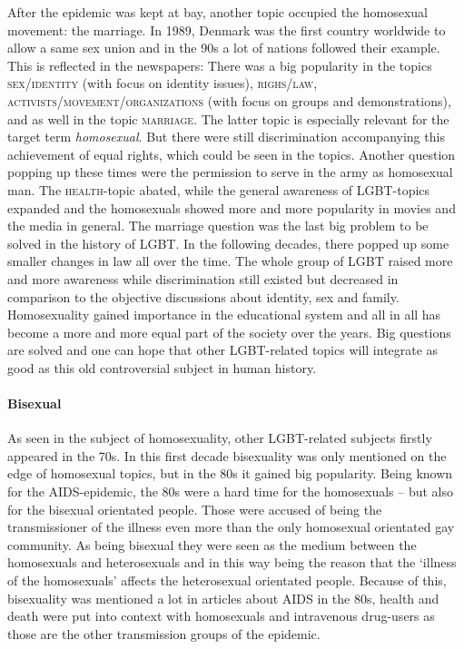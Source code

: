 \documentclass[10pt,a4paper,twocolumn]{scrartcl}
\begin{document}
After the epidemic was kept at bay, another topic occupied the homosexual movement: the marriage. In 1989, Denmark was the first country worldwide to allow a same sex union and in the 90s a lot of nations followed their example. This is reflected in the newspapers: There was a big popularity in the topics \textsc{sex/identity} (with focus on identity issues), \textsc{righs/law}, \textsc{activists/movement/organizations} (with focus on groups and demonstrations), and as well in the topic \textsc{marriage}. The latter topic is especially relevant for the target term \textit{homosexual}. But there were still discrimination accompanying this achievement of equal rights, which could be seen in the topics. Another question popping up these times were the permission to serve in the army as homosexual man. The \textsc{health}-topic abated, while the general awareness of LGBT-topics expanded and the homosexuals showed more and more popularity in movies and the media in general.
The marriage question was the last big problem to be solved in the history of LGBT. In the following decades, there popped up some smaller changes in law all over the time. The whole group of LGBT raised more and more awareness while discrimination still existed but decreased in comparison to the objective discussions about identity, sex and family. Homosexuality gained importance in the educational system and all in all has become a more and more equal part of the society over the years. Big questions are solved and one can hope that other LGBT-related topics will integrate as good as this old controversial subject in human history.

\paragraph*{Bisexual} As seen in the subject of homosexuality, other LGBT-related subjects firstly appeared in the 70s. In this first decade bisexuality was only mentioned on the edge of homosexual topics, but in the 80s it gained big popularity. Being known for the AIDS-epidemic, the 80s were a hard time for the homosexuals – but also for the bisexual orientated people. Those were accused of being the transmissioner of the illness even more than the only homosexual orientated gay community. As being bisexual they were seen as the medium between the homosexuals and heterosexuals and in this way being the reason that the `illness of the homosexuals' affects the heterosexual orientated people. Because of this, bisexuality was mentioned a lot in articles about AIDS in the 80s, health and death were put into context with homosexuals and intravenous drug-users as those are the other transmission groups of the epidemic.
\end{document}
